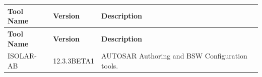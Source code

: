 \begin{longtable}{|l|l|l|}
\hline
\begin{minipage}{0.14\linewidth}\raggedright\vspace{.75ex}\textbf{Tool Name}\vspace{.75ex}\end{minipage} & \begin{minipage}{0.14\linewidth}\raggedright\vspace{.75ex}\textbf{Version}\vspace{.75ex}\end{minipage} & \begin{minipage}{0.64\linewidth}\raggedright\vspace{.75ex}\textbf{Description}\vspace{.75ex}\end{minipage}\\
\hline\hline
\endfirsthead
\hline
\begin{minipage}{0.14\linewidth}\raggedright\vspace{.75ex}\textbf{Tool Name}\vspace{.75ex}\end{minipage} & \begin{minipage}{0.14\linewidth}\raggedright\vspace{.75ex}\textbf{Version}\vspace{.75ex}\end{minipage} & \begin{minipage}{0.64\linewidth}\raggedright\vspace{.75ex}\textbf{Description}\vspace{.75ex}\end{minipage}\\
\hline\hline
\endhead
\hline
\endfoot
\hline
\endlastfoot
\begin{minipage}{0.14\linewidth}\raggedright\vspace{.75ex}ISOLAR-AB\vspace{.75ex}\end{minipage} & \begin{minipage}{0.14\linewidth}\raggedright\vspace{.75ex}12.3.3BETA1\vspace{.75ex}\end{minipage} & \begin{minipage}{0.64\linewidth}\raggedright\vspace{.75ex}AUTOSAR Authoring and BSW Configuration tools.\vspace{.75ex}\end{minipage}\\\hline

\end{longtable}
